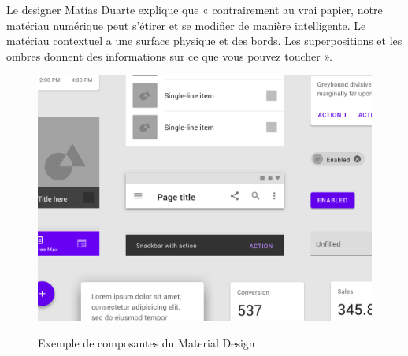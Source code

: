 Le designer Matías Duarte explique que « contrairement au vrai papier, notre matériau numérique peut s'étirer et se 
modifier de manière intelligente. Le matériau contextuel a une surface physique et des bords. Les superpositions et 
les ombres donnent des informations sur ce que vous pouvez toucher ».~\cite{MaterialDesign2020}
\begin{figure}[!h]

    \centering
    \includegraphics[width=5in]{images/Chapitre3/material design.png}
    \label{fig:label5}
    \caption{Exemple de composantes du Material Design}
\end{figure}

